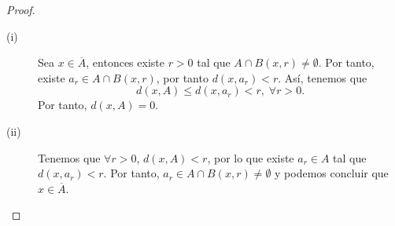 \begin{proof}
\begin{description}
\item[(i)] Sea $\displaystyle x \in \overline{A} $, entonces existe $\displaystyle r > 0 $ tal que $\displaystyle A \cap B\left(x,r\right) \neq \emptyset$. Por tanto, existe $\displaystyle a_{r} \in A \cap B\left(x,r\right) $, por tanto $\displaystyle d\left(x,a_{r}\right) < r $. Así, tenemos que 
	\[ d\left(x,A\right) \leq d\left(x,a_{r}\right) < r, \; \forall r > 0 .\]
	Por tanto, $\displaystyle d\left(x,A\right) = 0 $.
\item[(ii)] Tenemos que $\displaystyle \forall r > 0 $, $\displaystyle d\left(x,A\right) < r $, por lo que existe $\displaystyle a_{r} \in A $ tal que $\displaystyle d\left(x,a_{r}\right)< r $. Por tanto, $\displaystyle a_{r} \in A \cap B\left(x,r\right) \neq \emptyset $ y podemos concluir que $\displaystyle x \in \overline{A} $.
\end{description}
\end{proof}
